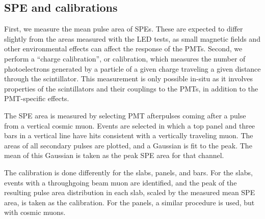{\subsection{SPE and \Npe calibrations}

First, we measure the mean
pulse area of SPEs. These are expected to differ slightly from the areas measured with the LED
tests, as small magnetic fields and other environmental effects can affect the response of the
PMTs. Second, we perform a ``charge calibration'', or \Npe calibration, 
which measures the number of photoelectrons
generated by a particle of a given charge traveling a given distance through the scintillator.
This measurement is only possible in-situ as it involves properties of the scintillators and
their couplings to the PMTs, in addition to the PMT-specific effects.

The SPE area is measured by selecting PMT afterpulses coming after a pulse from a vertical
cosmic muon. Events are selected in which a top panel and three bars in a vertical line have
hits consistent with a vertically traveling muon. The areas of all secondary pulses are plotted,
and a Gaussian is fit to the peak. The mean of this Gaussian is taken as the peak SPE area for that
channel.

The \Npe calibration is done differently for the slabs, panels, and bars. For the slabs,
events with a throughgoing beam muon are identified, and the peak of the resulting pulse area
distribution in each slab, scaled by the measured mean SPE area, is taken as the \Npe calibration.
For the panels, a similar procedure is used, but with cosmic muons.

}
